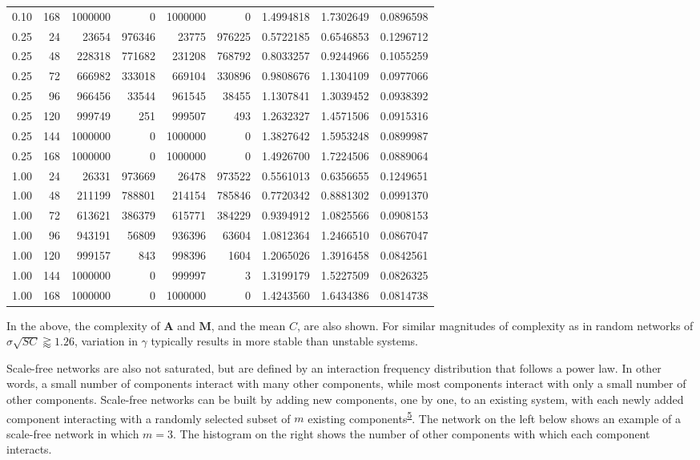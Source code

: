 \documentclass[]{article}
\begin{document}
\begin{longtable}[]{@{}rrrrrrrrr@{}}
0.10 & 168 & 1000000 & 0 & 1000000 & 0 & 1.4994818 & 1.7302649 &
0.0896598\tabularnewline
0.25 & 24 & 23654 & 976346 & 23775 & 976225 & 0.5722185 & 0.6546853 &
0.1296712\tabularnewline
0.25 & 48 & 228318 & 771682 & 231208 & 768792 & 0.8033257 & 0.9244966 &
0.1055259\tabularnewline
0.25 & 72 & 666982 & 333018 & 669104 & 330896 & 0.9808676 & 1.1304109 &
0.0977066\tabularnewline
0.25 & 96 & 966456 & 33544 & 961545 & 38455 & 1.1307841 & 1.3039452 &
0.0938392\tabularnewline
0.25 & 120 & 999749 & 251 & 999507 & 493 & 1.2632327 & 1.4571506 &
0.0915316\tabularnewline
0.25 & 144 & 1000000 & 0 & 1000000 & 0 & 1.3827642 & 1.5953248 &
0.0899987\tabularnewline
0.25 & 168 & 1000000 & 0 & 1000000 & 0 & 1.4926700 & 1.7224506 &
0.0889064\tabularnewline
1.00 & 24 & 26331 & 973669 & 26478 & 973522 & 0.5561013 & 0.6356655 &
0.1249651\tabularnewline
1.00 & 48 & 211199 & 788801 & 214154 & 785846 & 0.7720342 & 0.8881302 &
0.0991370\tabularnewline
1.00 & 72 & 613621 & 386379 & 615771 & 384229 & 0.9394912 & 1.0825566 &
0.0908153\tabularnewline
1.00 & 96 & 943191 & 56809 & 936396 & 63604 & 1.0812364 & 1.2466510 &
0.0867047\tabularnewline
1.00 & 120 & 999157 & 843 & 998396 & 1604 & 1.2065026 & 1.3916458 &
0.0842561\tabularnewline
1.00 & 144 & 1000000 & 0 & 999997 & 3 & 1.3199179 & 1.5227509 &
0.0826325\tabularnewline
1.00 & 168 & 1000000 & 0 & 1000000 & 0 & 1.4243560 & 1.6434386 &
0.0814738\tabularnewline
\bottomrule
\end{longtable}

In the above, the complexity of \(\mathbf{A}\) and \(\mathbf{M}\), and
the mean \(C\), are also shown. For similar magnitudes of complexity as
in random networks of \(\sigma\sqrt{SC} \gtrapprox 1.26\), variation in
\(\gamma\) typically results in more stable than unstable systems.

Scale-free networks are also not saturated, but are defined by an
interaction frequency distribution that follows a power law. In other
words, a small number of components interact with many other components,
while most components interact with only a small number of other
components. Scale-free networks can be built by adding new components,
one by one, to an existing system, with each newly added component
interacting with a randomly selected subset of \(m\) existing
components\textsuperscript{\protect\hyperlink{ref-Albert2002}{5}}. The
network on the left below shows an example of a scale-free network in
which \(m = 3\). The histogram on the right shows the number of other
components with which each component interacts.
\end{document}
